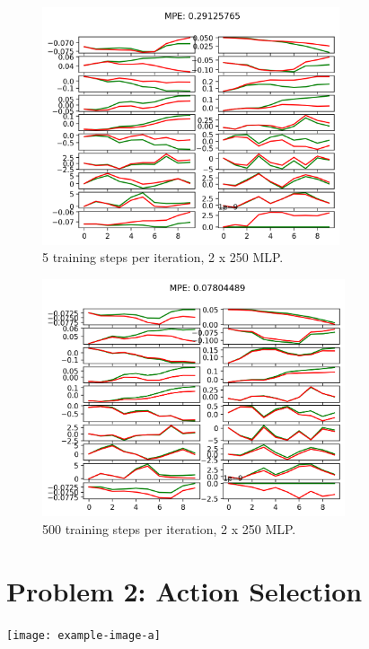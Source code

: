 \documentclass{article}
\begin{document}
\begin{answer}[title=Plot,height=9.5cm,width=\linewidth]
    \begin{figure}[H]
        \centering
        \includegraphics[height=7cm]{figs/Q1_2.png}
        \caption{5 training steps per iteration, 2 x 250 MLP.}
    \end{figure}
\end{answer}

\begin{answer}[title=Plot,height=9.5cm,width=\linewidth]
    \begin{figure}[H]
        \centering
        \includegraphics[height=7cm]{figs/Q1_3.png}
        \caption{500 training steps per iteration, 2 x 250 MLP.}
    \end{figure}
\end{answer}

\section{Problem 2: Action Selection}
\begin{answer}[title=Plot,height=9.5cm,width=\linewidth]
    \centering
    \texttt{[image: example-image-a]}
\end{answer}
\end{document}
